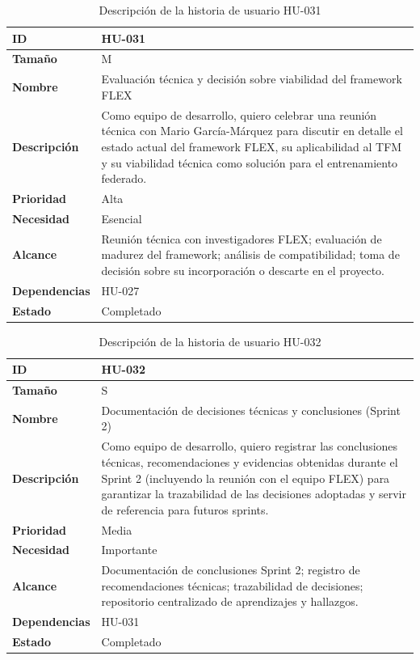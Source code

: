 \documentclass{report}
\begin{document}
\begin{table}[H]
\centering
\caption{Descripción de la historia de usuario HU-031}
\label{tab:hu031}
\begin{tabular}{|l|p{12cm}|}
\hline
\textbf{ID} & HU-031 \\ \hline
\textbf{Tamaño} & M \\ \hline
\textbf{Nombre} & Evaluación técnica y decisión sobre viabilidad del framework FLEX \\ \hline
\textbf{Descripción} &
Como equipo de desarrollo, quiero celebrar una reunión técnica con Mario García-Márquez para discutir en detalle el estado actual del framework FLEX, su aplicabilidad al TFM y su viabilidad técnica como solución para el entrenamiento federado. \\ \hline
\textbf{Prioridad} & Alta \\ \hline
\textbf{Necesidad} & Esencial \\ \hline
\textbf{Alcance} &
Reunión técnica con investigadores FLEX; evaluación de madurez del framework; análisis de compatibilidad; toma de decisión sobre su incorporación o descarte en el proyecto. \\ \hline
\textbf{Dependencias} & HU-027 \\ \hline
\textbf{Estado} & Completado \\ \hline
\end{tabular}
\end{table}



\begin{table}[H]
\centering
\caption{Descripción de la historia de usuario HU-032}
\label{tab:hu032}
\begin{tabular}{|l|p{12cm}|}
\hline
\textbf{ID} & HU-032 \\ \hline
\textbf{Tamaño} & S \\ \hline
\textbf{Nombre} & Documentación de decisiones técnicas y conclusiones (Sprint 2) \\ \hline
\textbf{Descripción} &
Como equipo de desarrollo, quiero registrar las conclusiones técnicas, recomendaciones y evidencias obtenidas durante el Sprint 2 (incluyendo la reunión con el equipo FLEX) para garantizar la trazabilidad de las decisiones adoptadas y servir de referencia para futuros sprints. \\ \hline
\textbf{Prioridad} & Media \\ \hline
\textbf{Necesidad} & Importante \\ \hline
\textbf{Alcance} &
Documentación de conclusiones Sprint 2; registro de recomendaciones técnicas; trazabilidad de decisiones; repositorio centralizado de aprendizajes y hallazgos. \\ \hline
\textbf{Dependencias} & HU-031 \\ \hline
\textbf{Estado} & Completado \\ \hline
\end{tabular}
\end{table}
\end{document}
